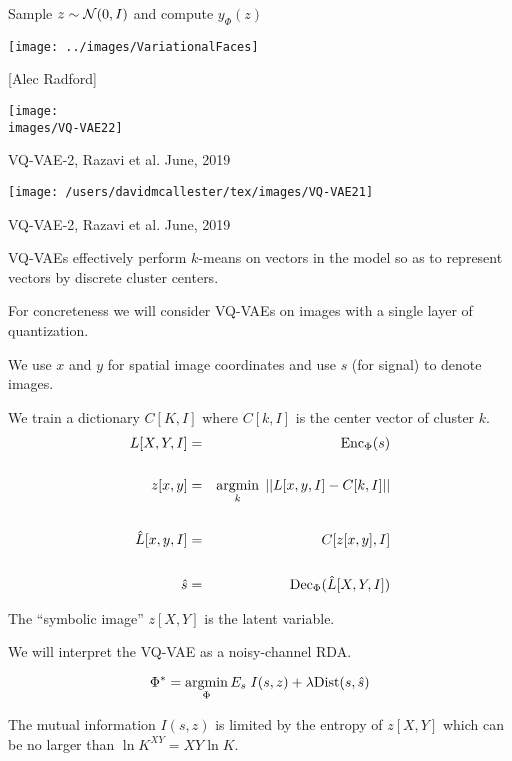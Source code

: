 {

\centerline{Sample {\color{red} $z \sim {\cal N}(0,I)$} and compute {\color{red} $y_\Phi(z)$}}

\vfill
\centerline{\texttt{[image: ../images/VariationalFaces]}}
\centerline{[Alec Radford]}


\centerline{\texttt{[image: \\images/VQ-VAE22]}}

\vfill
VQ-VAE-2, Razavi et al. June, 2019


\centerline{\texttt{[image: /users/davidmcallester/tex/images/VQ-VAE21]}}

\vfill
VQ-VAE-2, Razavi et al. June, 2019



VQ-VAEs effectively perform $k$-means on vectors in the model so as to represent vectors by discrete cluster centers.

\vfill
For concreteness we will consider VQ-VAEs on images with a single layer of quantization.

\vfill
We use $x$ and $y$ for spatial image coordinates and use $s$ (for signal) to denote images.


We train a dictionary $C[K,I]$ where $C[k,I]$ is the center vector of cluster $k$.
\begin{eqnarray*}
L[X,Y,I] & = & \mathrm{Enc}_\Phi(s) \\
\\
z[x,y] & = & \operatorname*{argmin}_k \;||L[x,y,I] - C[k,I]|| \\
\\
\hat{L}[x,y,I] & = & C[z[x,y],I] \\
\\
\hat{s} & = & \mathrm{Dec}_\Phi(\hat{L}[X,Y,I])
\end{eqnarray*}

\vfill
The ``symbolic image'' $z[X,Y]$ is the latent variable.


We will interpret the VQ-VAE as a noisy-channel RDA.

$$\Phi^*  =  \operatorname*{argmin}_\Phi E_s\;I(s,z) + \lambda\mathrm{Dist}(s,\hat{s})$$

\vfill
The mutual information $I(s,z)$ is limited by the entropy of $z[X,Y]$ which can be no larger than $\ln K^{XY} = XY\ln K$.

}
